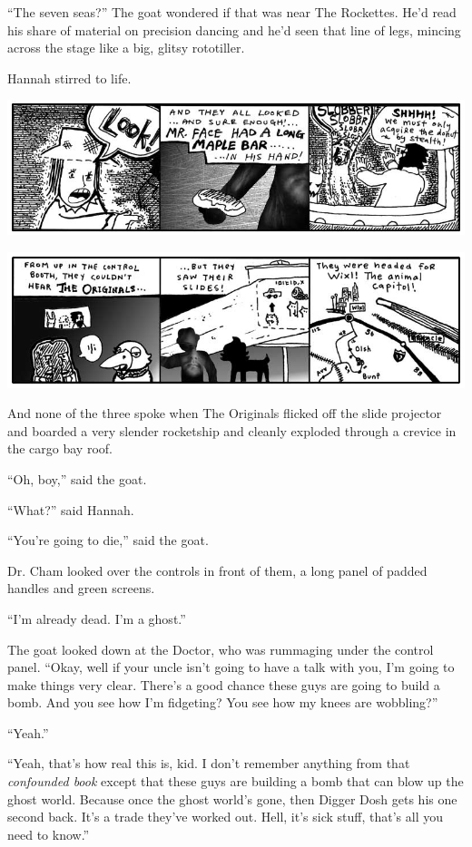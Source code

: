 \documentclass[10pt,twoside]{report}
\begin{document}
``The seven seas?''  The goat wondered if that was near The Rockettes.
He'd read his share of material on precision dancing and he'd seen
that line of legs, mincing across the stage like a big, glitsy
rototiller.

Hannah stirred to life.

	\includegraphics[width=1.0\textwidth]{cache/52.png}

	\includegraphics[width=1.0\textwidth]{cache/53.png}

And none of the three spoke when The Originals flicked off the slide
projector and boarded a very slender rocketship and cleanly exploded
through a crevice in the cargo bay roof.

``Oh, boy,'' said the goat.

``What?'' said Hannah.

``You're going to die,'' said the goat.

Dr. Cham looked over the controls in front of them, a long panel of
padded handles and green screens.

``I'm already dead.  I'm a ghost.''

The goat looked down at the Doctor, who was rummaging under the
control panel.  ``Okay, well if your uncle isn't going to have a talk
with you, I'm going to make things very clear.  There's a good chance
these guys are going to build a bomb.  And you see how I'm fidgeting?
You see how my knees are wobbling?''

``Yeah.''

``Yeah, that's how real this is, kid.  I don't remember anything from
that {\em confounded book} except that these guys are building a bomb
that can blow up the ghost world.  Because once the ghost world's
gone, then Digger Dosh gets his one second back.  It's a trade they've
worked out.  Hell, it's sick stuff, that's all you need to know.''
\end{document}
